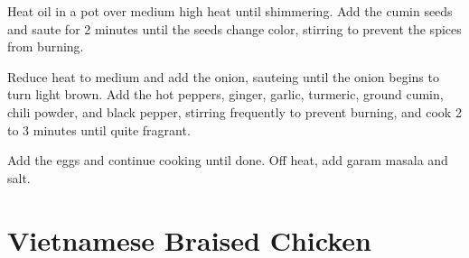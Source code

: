 \documentclass[oneside]{book}  %
\def\thisrecipe{}  %
\newcommand{\recipe}[1]{\section{#1}\def\thisrecipe{: #1}} %
\begin{document}
\begin{directions}
  \item Heat oil in a pot over medium high heat until shimmering. Add the cumin
    seeds and saute for 2 minutes until the seeds change color, stirring to
    prevent the spices from burning.
  \item Reduce heat to medium and add the onion, sauteing until the onion begins
    to turn light brown. Add the hot peppers, ginger, garlic, turmeric, ground
    cumin, chili powder, and black pepper, stirring frequently to prevent
    burning, and cook 2 to 3 minutes until quite fragrant.
  \item Add the eggs and continue cooking until done. Off heat, add garam masala
    and salt.
\end{directions}


\todo[Tomatoes and red cabbage?]
\recipe{Vietnamese Braised Chicken} \label{recipe:vietnamese_braised_chicken} %
\end{document}
